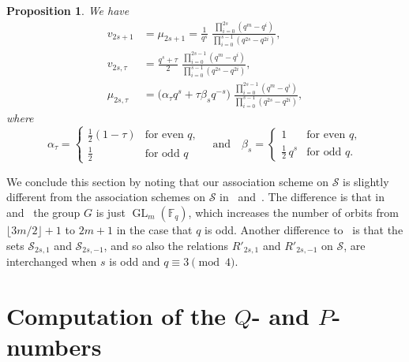 \documentclass[10pt]{article}
\newtheorem{prop}[theorem]{Proposition}
\theoremstyle{definition}
\newcommand{\FF}{\mathbb{F}}
\renewcommand{\S}{\mathscr{S}}
\renewcommand{\t}{\tau}
\newcommand{\floor}[1]{\lfloor#1\rfloor}
\DeclareMathOperator{\GL}{GL}
\begin{document}
\begin{prop}
\label{pro:valencies_multiplicities}
We have
\begin{align*}
v_{2s+1}&=\mu_{2s+1}=\frac{1}{q^s}\;\frac{\prod\limits_{i=0}^{2s}(q^m-q^i)}{\prod\limits_{i=0}^{s-1}(q^{2s}-q^{2i})},\\%
v_{2s,\t}&=\frac{q^s+\t}{2}\;\frac{\prod\limits_{i=0}^{2s-1}(q^m-q^i)}{\prod\limits_{i=0}^{s-1}(q^{2s}-q^{2i})},\\%
\mu_{2s,\t}&=\big(\alpha_\t q^s+\t\beta_sq^{-s}\big)\;\frac{\prod\limits_{i=0}^{2s-1}(q^m-q^i)}{\prod\limits_{i=0}^{s-1}(q^{2s}-q^{2i})},
\end{align*}
where
\[
\alpha_\t=\begin{cases}
\tfrac{1}{2}(1-\t) & \text{for even $q$},\\%
\tfrac{1}{2}       & \text{for odd $q$}
\end{cases}
\quad\text{and}\quad
\beta_s=\begin{cases}
1                  & \text{for even $q$},\\%
\tfrac{1}{2}\, q^s & \text{for odd $q$}.
\end{cases}
\]
\end{prop}
\par
We conclude this section by noting that our association scheme on $\S$ is slightly different from the association schemes on $\S$ in~\cite{WanWanMaMa2003} and~\cite{Sch2015}. The difference is that in~\cite{WanWanMaMa2003} and~\cite{Sch2015} the group $G$ is just $\GL_m(\FF_q)$, which increases the number of orbits from $\floor{3m/2}+1$ to $2m+1$ in the case that $q$ is odd. Another difference to~\cite{Sch2015} is that the sets $\S_{2s,1}$ and $\S_{2s,-1}$, and so also the relations $R'_{2s,1}$ and $R'_{2s,-1}$ on $\S$, are interchanged when $s$ is odd and $q\equiv 3\pmod 4$.

%

\section{Computation of the \texorpdfstring{$Q$}{Q}- and \texorpdfstring{$P$}{P}-numbers}
\end{document}
